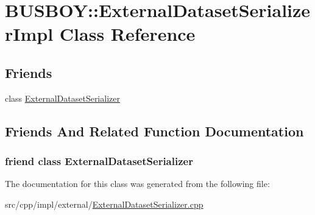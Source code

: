 \hypertarget{classBUSBOY_1_1ExternalDatasetSerializerImpl}{
\section{BUSBOY::ExternalDatasetSerializerImpl Class Reference}
\label{classBUSBOY_1_1ExternalDatasetSerializerImpl}
}
\subsection*{Friends}
\begin{DoxyCompactItemize}
\item 
class \hyperlink{classBUSBOY_1_1ExternalDatasetSerializerImpl_a820d3cc7affcfdfb68691f2bcb20fa49}{ExternalDatasetSerializer}
\end{DoxyCompactItemize}


\subsection{Friends And Related Function Documentation}
\hypertarget{classBUSBOY_1_1ExternalDatasetSerializerImpl_a820d3cc7affcfdfb68691f2bcb20fa49}{
\subsubsection[{ExternalDatasetSerializer}]{\setlength{\rightskip}{0pt plus 5cm}friend class {\bf ExternalDatasetSerializer}}}
\label{classBUSBOY_1_1ExternalDatasetSerializerImpl_a820d3cc7affcfdfb68691f2bcb20fa49}


The documentation for this class was generated from the following file:\begin{DoxyCompactItemize}
\item 
src/cpp/impl/external/\hyperlink{ExternalDatasetSerializer_8cpp}{ExternalDatasetSerializer.cpp}\end{DoxyCompactItemize}
